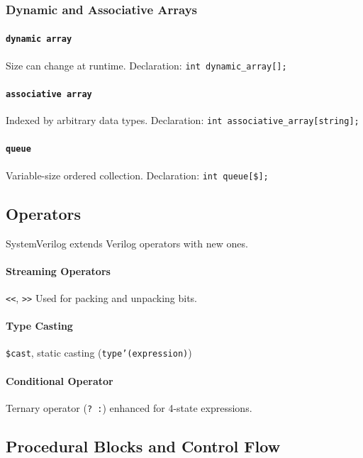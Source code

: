 \subsubsection{Dynamic and Associative Arrays}
\paragraph{\texttt{dynamic array}} Size can change at runtime. Declaration: \texttt{int dynamic\_array[];}

\paragraph{\texttt{associative array}} Indexed by arbitrary data types. Declaration: \texttt{int associative\_array[string];}

\paragraph{\texttt{queue}} Variable-size ordered collection. Declaration: \texttt{int queue[\$];}

\subsection{Operators}
SystemVerilog extends Verilog operators with new ones.

\paragraph{\textbf{Streaming Operators}} \texttt{<<}, \texttt{>>} Used for packing and unpacking bits.

\paragraph{\textbf{Type Casting}} \texttt{\$cast}, static casting (\texttt{type'(expression)})

\paragraph{\textbf{Conditional Operator}} Ternary operator (\texttt{? :}) enhanced for 4-state expressions.

\subsection{Procedural Blocks and Control Flow}

